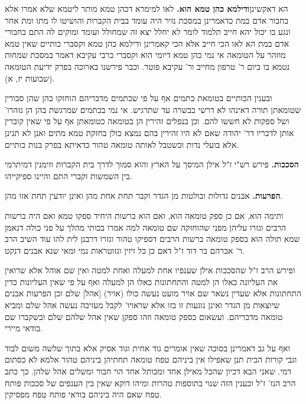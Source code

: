 \documentclass[12pt, openany]{book}
\newcommand{\sethebfont}{
\fontsize{10.5pt}{21.0pt} \selectfont
}
\newcommand{\twocol}[1]{
	{\sethebfont \begin{multicols}{2}
			#1
	\end{multicols}}	
}
\begin{document}
\twocol{הא דאקשינן\textbf{ודילמא כהן טמא הוא.}  לאו למימרא דכהן טמא מותר ליטמא שלא אמרו אלא בחבור אדם במת כדאמרינן במסכת נזיר היה עומד בבית הקברות והושיטו לו מתו ומת אחר ונגע בו יכול יהא חייב תלמוד לומר לא יחלל יצא זה שמחולל ועומד ומוקים לה התם בחבורי אדם במת הא לאו הכי חייב אלא הכי קאמרינן ודילמא כהן טמא וקסברי כותיים שאין טמא מוזהר על הטומאה אי נמי כהן טמא דיומי הוא וקסברי כרבי עקיבא דאמר במסכת שמחות נטמא בו ביום ר' טרפון מחייב ור' עקיבא פוטר. וכבר פירשנו בארוכה בפרק ידיעת הטומאה (שבועות יז, א).\par ובענין הכותיים בטומאת כתמים אף על פי שכתמים מדבריהם הוחזקו בהן שהן סבורין שטומאתן תורה דאינהו לא דרשי בבשרה עד שתרגיש. אי נמי בכתמים שמרגשת בהן הן נזהרו' ושל ספקות לא חששו להם. וכן בנפלים זהירין הן בטומאה כטומאתן אף על פי שאין קוברין אותן לדבריו דר' יהודה שאם לא היו זהירין בהם נמצא כולן בחזקת טמא מתים ואנן לא תנינן אלא בועלי נדות וכשטבל לאותה טומאה טהור כדאיתא בפרק בנות כותיים. 
\par\textbf{הסככות.}  פירש רש"י ז"ל אילן המיסך על הארץ והוא סמוך לדרך בית הקברות וזימנין דמיתרמי בין השמשות וקברי התם והיינו ספיקייהו. 
\par\textbf{הפרעות.}  אבנים גדולות ובולטות מן הגדר וקבר תחת אחת מהן ואינן יודעין תחת אזו מהן.\par ותימה הוא, אם כן ספק טומאה הוא, ואם הוא ברשות היחיד ספקו טמא ואם היה ברשות הרבים וגזרו עליהן מפני שהוחזקה שם טומאה למה אמרו בכותי מהלך על פני כולה דנאמן שמא תולה הוא בספק טומאה ברשות הרבים דספיקו טהור וגזרו דרבנן לית להו עוד השיב הרב ר' אברהם בר דוד ז"ל דאם כן כל זיזין וגזוטראות נמי ומאי שנא אבנים דנקט.\par ופירש הרב ז"ל שהסככות אילן שענפיו אחת למעלה ואחת למטה ואין שם אוהל אלא שרואין את העליונה כאלו הן למטה והתחתונות כאלו הן למעלה ואף על פי שאין העליונות כדין התחתונות אלא שעדין נשאר שם אויר מועט נעשה כולו (אויר) [אהל] שלם וכן הפרעות אבנים שיוצאות מן הגדר ואינן נוגעות זו בזו אלא שראויו' לקבל מעזיבה נעשה אהל שלם ומביא טומאה מדבריהם. ועשאום כספק טומאה וזהו ספקן שאין אהל שלהם שלם ובשקברו שם בודאי מיירי.\par  ואף על גב דאמרינן בסוכה שאין אומרים גוד אחית וגוד אסיק אלא בתוך שלשה משום לבוד וגבי קורות הבית תנן שאפילו אין ביניהם טפח טומאה תחתיהן ביניהם טהור אלמא לא כסתום דמי. שאני הבא דכיון שהכל מאילן אחד ומכותל אחד הוי חבור ומשלים אהל שלהן. כך כתב הרב הנז' ז"ל וכענין הזה שנוי בתוספות טהרות ומיהו דוקא שאין בין הענפים של סככות פותח טפח שאם היה ביניהם בודאי פותח טפח מפסיקין. 
}
\end{document}

